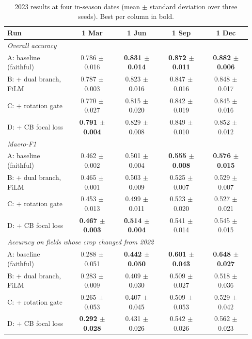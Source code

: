 \begin{table}[t]
\centering
\small
\caption{2023 results at four in-season dates (mean $\pm$ standard deviation over three seeds). Best per column in bold.}
\label{tab:ablation}
\begin{tabular}{lcccc}
\hline
Run & 1 Mar & 1 Jun & 1 Sep & 1 Dec \\
\hline
\multicolumn{5}{l}{\textit{Overall accuracy}} \\
A: baseline (faithful) & 0.786 $\pm$ 0.016 & \textbf{0.831 $\pm$ 0.014} & \textbf{0.872 $\pm$ 0.011} & \textbf{0.882 $\pm$ 0.006} \\
B: + dual branch, FiLM & 0.787 $\pm$ 0.003 & 0.823 $\pm$ 0.016 & 0.847 $\pm$ 0.016 & 0.848 $\pm$ 0.017 \\
C: + rotation gate & 0.770 $\pm$ 0.027 & 0.815 $\pm$ 0.020 & 0.842 $\pm$ 0.019 & 0.845 $\pm$ 0.016 \\
D: + CB focal loss & \textbf{0.791 $\pm$ 0.004} & 0.829 $\pm$ 0.008 & 0.849 $\pm$ 0.010 & 0.852 $\pm$ 0.012 \\
\hline
\multicolumn{5}{l}{\textit{Macro-F1}} \\
A: baseline (faithful) & 0.462 $\pm$ 0.002 & 0.501 $\pm$ 0.004 & \textbf{0.555 $\pm$ 0.008} & \textbf{0.576 $\pm$ 0.015} \\
B: + dual branch, FiLM & 0.465 $\pm$ 0.001 & 0.503 $\pm$ 0.009 & 0.525 $\pm$ 0.007 & 0.529 $\pm$ 0.007 \\
C: + rotation gate & 0.453 $\pm$ 0.013 & 0.499 $\pm$ 0.011 & 0.523 $\pm$ 0.020 & 0.527 $\pm$ 0.021 \\
D: + CB focal loss & \textbf{0.467 $\pm$ 0.003} & \textbf{0.514 $\pm$ 0.004} & 0.541 $\pm$ 0.014 & 0.545 $\pm$ 0.015 \\
\hline
\multicolumn{5}{l}{\textit{Accuracy on fields whose crop changed from 2022}} \\
A: baseline (faithful) & 0.288 $\pm$ 0.051 & \textbf{0.442 $\pm$ 0.050} & \textbf{0.601 $\pm$ 0.043} & \textbf{0.648 $\pm$ 0.027} \\
B: + dual branch, FiLM & 0.283 $\pm$ 0.009 & 0.409 $\pm$ 0.030 & 0.509 $\pm$ 0.027 & 0.518 $\pm$ 0.036 \\
C: + rotation gate & 0.265 $\pm$ 0.053 & 0.407 $\pm$ 0.045 & 0.509 $\pm$ 0.053 & 0.529 $\pm$ 0.042 \\
D: + CB focal loss & \textbf{0.292 $\pm$ 0.028} & 0.431 $\pm$ 0.026 & 0.542 $\pm$ 0.026 & 0.562 $\pm$ 0.023 \\
\hline
\end{tabular}
\end{table}
